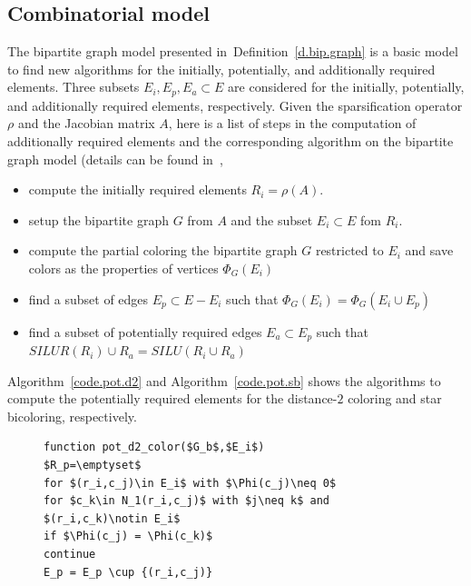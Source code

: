 \documentclass[12pt, twoside,a4paper,toc=bibliography]{scrbook}
\newcommand{\defref}[1]{Definition~\protect\ref{#1}}
\newcommand{\coderef}[1]{Algorithm~\protect\ref{#1}}
\begin{document}
\subsection{Combinatorial model}
\label{ss.comb.precond}
The bipartite graph model presented in~\defref{d.bip.graph} is
a basic model to find new algorithms for the initially, potentially,
and additionally required elements. Three subsets $E_i, E_p, E_a\subset E$
are considered for the initially, potentially,
and additionally required elements, respectively.
Given the sparsification operator $\rho$ and the Jacobian matrix $A$,
here is a list of steps in the computation of additionally required elements
and the corresponding algorithm on the bipartite graph model
(details can be found in~\cite{Lulfesmann2012Fap},
\begin{itemize}
\item compute the initially required elements $R_i = \rho(A)$.
\item setup the bipartite graph $G$ from $A$ and the subset $E_i\subset E$ fom $R_i$.
\item compute the partial coloring the bipartite graph $G$ restricted to $E_i$
and save colors as the properties of vertices $\Phi_{G}(E_i)$
\item find a subset of edges $E_p\subset E - E_i$ such that $\Phi_{G}(E_i) = \Phi_{G}(E_i \cup E_p)$
\item find a subset of potentially required edges $E_a\subset E_p$ such
that $SILUR(R_i) \cup R_a = SILU(R_i \cup R_a)$
\end{itemize}
\coderef{code.pot.d2} and \coderef{code.pot.sb} shows the algorithms to compute the
potentially required elements for the distance-$2$ coloring and star bicoloring, respectively.
\begin{figure}
\begin{lstlisting}[caption=Find potentially required elements for
distance-$2$ coloring,label=code.pot.d2,mathescape]
function pot_d2_color($G_b$,$E_i$)
$R_p=\emptyset$
for $(r_i,c_j)\in E_i$ with $\Phi(c_j)\neq 0$
for $c_k\in N_1(r_i,c_j)$ with $j\neq k$ and $(r_i,c_k)\notin E_i$
if $\Phi(c_j) = \Phi(c_k)$
continue
E_p = E_p \cup {(r_i,c_j)}
\end{lstlisting}
\end{figure}
\end{document}
